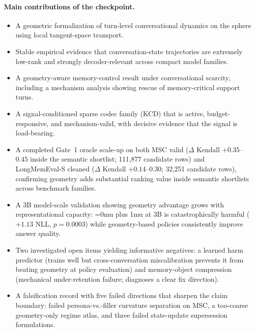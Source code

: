 \documentclass[conference]{IEEEtran}
\newcommand{\pname}[1]{\begingroup\Urlmuskip=0mu plus 1mu\relax\path{#1}\endgroup}
\begin{document}
\paragraph{Main contributions of the checkpoint.}
\begin{itemize}[leftmargin=1.4em]
    \item A geometric formalization of turn-level conversational dynamics on the sphere using local tangent-space transport.
    \item Stable empirical evidence that conversation-state trajectories are extremely low-rank and strongly decoder-relevant across compact model families.
    \item A geometry-aware memory-control result under conversational scarcity, including a mechanism analysis showing rescue of memory-critical support turns.
    \item A signal-conditioned sparse codec family (KCD) that is active, budget-responsive, and mechanism-valid, with decisive evidence that the signal is load-bearing.
    \item A completed Gate~1 oracle scale-up on both MSC valid ($\Delta$ Kendall $+0.35$--$0.45$ inside the semantic shortlist; 111{,}877 candidate rows) and LongMemEval-S cleaned ($\Delta$ Kendall $+0.14$--$0.30$; 32{,}251 candidate rows), confirming geometry adds substantial ranking value inside semantic shortlists across benchmark families.
    \item A 3B model-scale validation showing geometry advantage grows with representational capacity: \pname{semantic_KCD} at 3B is catastrophically harmful ($+1.13$ NLL, $p=0.0003$) while geometry-based policies consistently improve answer quality.
    \item Two investigated open items yielding informative negatives: a learned harm predictor (trains well but cross-conversation miscalibration prevents it from beating geometry at policy evaluation) and memory-object compression (mechanical under-retention failure; diagnoses a clear fix direction).
    \item A falsification record with five failed directions that sharpen the claim boundary: failed persona-vs.-filler curvature separation on MSC, a too-coarse geometry-only regime atlas, and three failed state-update supersession formulations.
\end{itemize}
\end{document}
